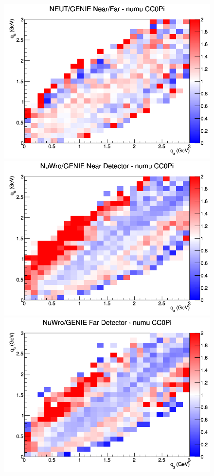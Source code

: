 \documentclass[12pt]{article}
\begin{document}
\begin{figure}[h]
\endminipage
{}
\includegraphics[width=\linewidth]{eff_q0_q3/FGT/ratios/CC0Pi_NEUT_GENIE_numu_NF_q3_q0.png}
\endminipage
\newline
{}
\includegraphics[width=\linewidth]{eff_q0_q3/FGT/ratios/CC0Pi_NuWro_GENIE_numu_near_q3_q0.png}
\endminipage
{}
\includegraphics[width=\linewidth]{eff_q0_q3/FGT/ratios/CC0Pi_NuWro_GENIE_numu_far_q3_q0.png}

\end{figure}
\end{document}
